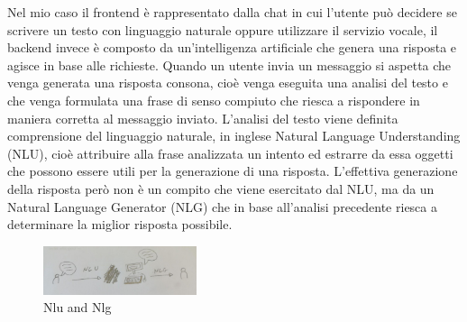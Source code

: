 Nel mio caso il frontend è rappresentato dalla chat in cui l'utente può decidere se scrivere un testo con linguaggio naturale oppure utilizzare il servizio vocale, il backend invece è composto da un'intelligenza artificiale che genera una risposta e agisce in base alle richieste.
Quando un utente invia un messaggio si aspetta che venga generata una risposta consona, cioè venga eseguita una analisi del testo e che venga formulata una frase di senso compiuto che riesca a rispondere in maniera corretta al messaggio inviato.
L'analisi del testo viene definita comprensione del linguaggio naturale, in inglese Natural Language Understanding (NLU), cioè attribuire alla frase analizzata un intento ed estrarre da essa oggetti che possono essere utili per la generazione di una risposta.
L'effettiva generazione della risposta però non è un compito che viene esercitato dal NLU, ma da un Natural Language Generator (NLG) che in base all'analisi precedente riesca a determinare la miglior risposta possibile.
\begin{figure}[H]
 \centering
    \includegraphics[width=0.4\textwidth]{img/nlu_nlg.jpg}
 \caption{Nlu and Nlg}
\end{figure}
